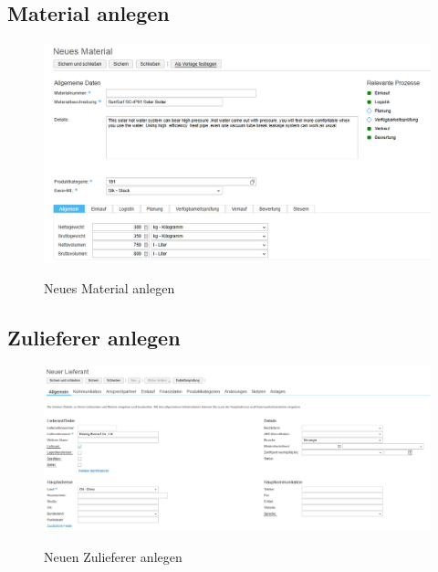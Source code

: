 \subsection{Material anlegen}
\label{addmat}

\begin{figure}[H]
	\begin{center}
	\includegraphics[width=1.0\textwidth]{grafiken/ByDesign-HowTo-1.png}
	\caption{Neues Material anlegen}
	\vspace{-10pt}
	\label{abb:byd-newmaterial}
	\end{center}
\end{figure}

\subsection{Zulieferer anlegen}
\label{addsup}

\begin{figure}[H]
	\begin{center}
	\includegraphics[width=1.0\textwidth]{grafiken/ByDesign-HowTo-2.png}
	\caption{Neuen Zulieferer anlegen}
	\vspace{-10pt}
	\label{abb:byd-newsupplier}
	\end{center}
\end{figure}

